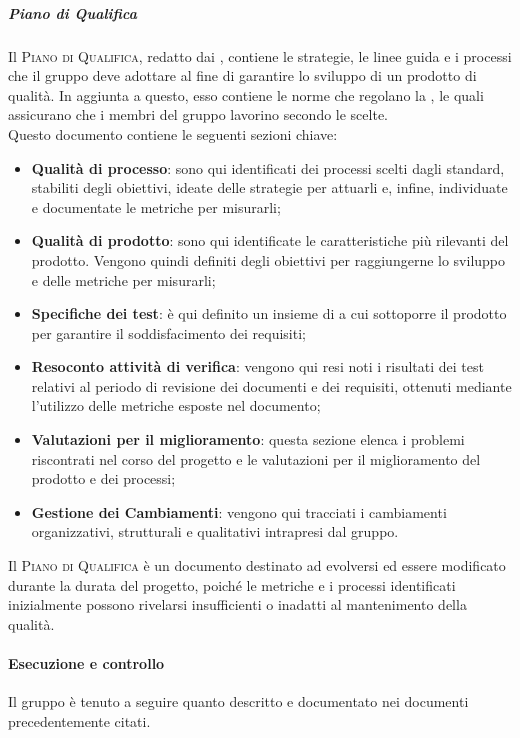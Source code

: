 \documentclass[../norme-di-progetto.tex]{subfiles}
\begin{document}
\subparagraph*{Piano di Qualifica}
Il \textsc{Piano di Qualifica}, redatto dai , contiene le strategie, le linee guida e i processi che il gruppo deve adottare al fine di garantire lo sviluppo di un prodotto di qualità. In aggiunta a questo, esso contiene le norme che regolano la , le quali assicurano che i membri del gruppo lavorino secondo le  scelte. \\
Questo documento contiene le seguenti sezioni chiave:
\begin{itemize}
  \item \textbf{Qualità di processo}: sono qui identificati dei processi scelti dagli standard, stabiliti degli obiettivi, ideate delle strategie per attuarli e, infine, individuate e documentate le metriche per misurarli;
  \item \textbf{Qualità di prodotto}: sono qui identificate le caratteristiche più rilevanti del prodotto. Vengono quindi definiti degli obiettivi per raggiungerne lo sviluppo e delle metriche per misurarli;
  \item \textbf{Specifiche dei test}: è qui definito un insieme di  a cui sottoporre il prodotto per garantire il soddisfacimento dei requisiti;
  \item \textbf{Resoconto attività di verifica}: vengono qui resi noti i risultati dei test relativi al periodo di revisione dei documenti e dei requisiti, ottenuti mediante l'utilizzo delle metriche esposte nel documento;
  \item \textbf{Valutazioni per il miglioramento}: questa sezione elenca i problemi riscontrati nel corso del progetto e le valutazioni per il miglioramento del prodotto e dei processi;
  \item \textbf{Gestione dei Cambiamenti}: vengono qui tracciati i cambiamenti organizzativi, strutturali e qualitativi intrapresi dal gruppo.
\end{itemize}
Il \textsc{Piano di Qualifica} è un documento destinato ad evolversi ed essere modificato durante la durata del progetto, poiché le metriche e i processi identificati inizialmente possono rivelarsi insufficienti o inadatti al mantenimento della qualità.

\paragraph{Esecuzione e controllo}
Il gruppo è tenuto a seguire quanto descritto e documentato nei documenti precedentemente citati.
\end{document}
